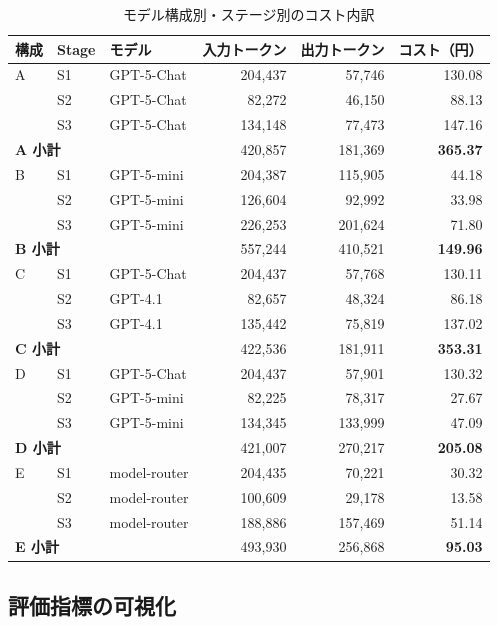 \documentclass[a4paper,10pt]{jarticle}
\begin{document}
\begin{table}[htbp]
\centering
\caption{モデル構成別・ステージ別のコスト内訳}
\label{tab:cost_per_stage}
\small
\begin{tabular}{lllrrr}
\toprule
構成 & Stage & モデル & 入力トークン & 出力トークン & コスト（円） \\
\midrule
A & S1 & GPT-5-Chat & 204,437 & 57,746 & 130.08 \\
  & S2 & GPT-5-Chat & 82,272 & 46,150 & 88.13 \\
  & S3 & GPT-5-Chat & 134,148 & 77,473 & 147.16 \\
\multicolumn{3}{l}{\textbf{A 小計}} & 420,857 & 181,369 & \textbf{365.37} \\
\midrule
B & S1 & GPT-5-mini & 204,387 & 115,905 & 44.18 \\
  & S2 & GPT-5-mini & 126,604 & 92,992 & 33.98 \\
  & S3 & GPT-5-mini & 226,253 & 201,624 & 71.80 \\
\multicolumn{3}{l}{\textbf{B 小計}} & 557,244 & 410,521 & \textbf{149.96} \\
\midrule
C & S1 & GPT-5-Chat & 204,437 & 57,768 & 130.11 \\
  & S2 & GPT-4.1 & 82,657 & 48,324 & 86.18 \\
  & S3 & GPT-4.1 & 135,442 & 75,819 & 137.02 \\
\multicolumn{3}{l}{\textbf{C 小計}} & 422,536 & 181,911 & \textbf{353.31} \\
\midrule
D & S1 & GPT-5-Chat & 204,437 & 57,901 & 130.32 \\
  & S2 & GPT-5-mini & 82,225 & 78,317 & 27.67 \\
  & S3 & GPT-5-mini & 134,345 & 133,999 & 47.09 \\
\multicolumn{3}{l}{\textbf{D 小計}} & 421,007 & 270,217 & \textbf{205.08} \\
\midrule
E & S1 & model-router & 204,435 & 70,221 & 30.32 \\
  & S2 & model-router & 100,609 & 29,178 & 13.58 \\
  & S3 & model-router & 188,886 & 157,469 & 51.14 \\
\multicolumn{3}{l}{\textbf{E 小計}} & 493,930 & 256,868 & \textbf{95.03} \\
\bottomrule
\end{tabular}
\end{table}


\subsection{評価指標の可視化}
\label{subsec:appendix_figures}
\end{document}
